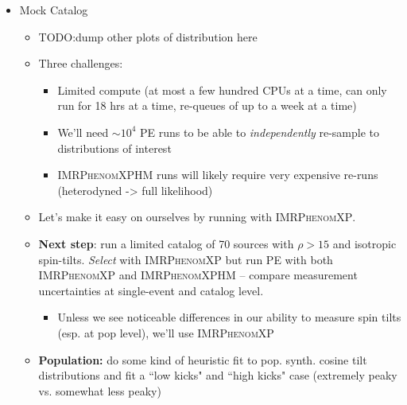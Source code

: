 \documentclass[
    aps,
    prd,
    reprint,
    onecolumn,
    superscriptaddress,
    linenumbers,
    nolongbibliography,
    nobibnotes,
    nofootinbib,
]{revtex4-2}
\newcommand{\todo}[1]{{\color{red}TODO:}{\color{blue}#1}}
\begin{document}
\begin{itemize}
\begin{itemize}
        \item notes during meeting
        \begin{itemize}
            \item Mike agrees we dont need lots of pop synth
            \item more enlightening to do Monte Carlo study with many different prescriptions for re-alignment, kick distributions \& prescriptions
            \item expand my existing Monte Carlo code with \textit{two} supernovae
            \item if we do find regions that give us peaks away from 1, fold into a population model and run on GWTC-4
            \item total mass or separation on one axis, kick velocity on another, location of peak/lower of HDI90
            \item look at mass slices of tilt angle distribution
        \end{itemize}
    \end{itemize}
    \item Mock Catalog
    \begin{itemize}
        \item \todo{dump other plots of distribution here}
        \item Three challenges:
        \begin{itemize}
            \item Limited compute (at most a few hundred CPUs at a time, can only run for 18 hrs at a time, re-queues of up to a week at a time)
            \item We'll need $\sim 10^4$ PE runs to be able to \textit{independently} re-sample to distributions of interest
            \item \textsc{IMRPhenomXPHM} runs will likely require very expensive re-runs (heterodyned -> full likelihood)
        \end{itemize}
        \item Let's make it easy on ourselves by running with \textsc{IMRPhenomXP}.
        \item \textbf{Next step}: run a limited catalog of 70 sources with $\rho > 15$ and isotropic spin-tilts. \textit{Select} with \textsc{IMRPhenomXP} but run PE with both \textsc{IMRPhenomXP} and \textsc{IMRPhenomXPHM} -- compare measurement uncertainties at single-event and catalog level.
        \begin{itemize}
            \item Unless we see noticeable differences in our ability to measure spin tilts (esp. at pop level), we'll use \textsc{IMRPhenomXP}
        \end{itemize}
        \item \textbf{Population:} do some kind of heuristic fit to pop. synth. cosine tilt distributions and fit a ``low kicks" and ``high kicks" case (extremely peaky vs. somewhat less peaky)
    \end{itemize}


\end{itemize}
\end{document}
